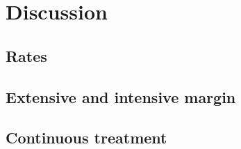 \section{Discussion}
\label{sec:disc}

\subsection{Rates}
\label{sec:disc_rates}

\subsection{Extensive and intensive margin}
\label{sec:disc_ext}

\subsection{Continuous treatment}




